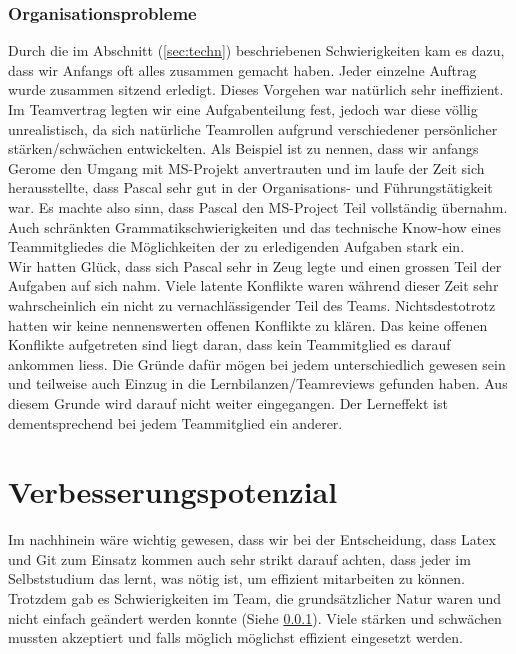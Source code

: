 \subsubsection {Organisationsprobleme} \label{sec:orgprob}
Durch die im Abschnitt (\ref{sec:techn}) beschriebenen Schwierigkeiten kam es dazu, dass wir Anfangs oft alles zusammen gemacht haben. Jeder einzelne Auftrag wurde zusammen sitzend erledigt. Dieses Vorgehen war natürlich sehr ineffizient. Im Teamvertrag legten wir eine Aufgabenteilung fest, jedoch war diese völlig unrealistisch, da sich natürliche Teamrollen aufgrund verschiedener persönlicher stärken/schwächen entwickelten. Als Beispiel ist zu nennen, dass wir anfangs Gerome den Umgang mit MS-Projekt anvertrauten und im laufe der Zeit sich herausstellte, dass Pascal sehr gut in der Organisations- und Führungstätigkeit war. Es machte also sinn, dass Pascal den MS-Project Teil vollständig übernahm. Auch schränkten Grammatikschwierigkeiten und das technische Know-how eines Teammitgliedes die Möglichkeiten der zu erledigenden Aufgaben stark ein. \\
Wir hatten Glück, dass sich Pascal sehr in Zeug legte und einen grossen Teil der Aufgaben auf sich nahm. Viele latente Konflikte waren während dieser Zeit sehr wahrscheinlich ein nicht zu vernachlässigender Teil des Teams. Nichtsdestotrotz hatten wir keine nennenswerten offenen Konflikte zu klären. Das keine offenen Konflikte aufgetreten sind liegt daran, dass kein Teammitglied es darauf ankommen liess. Die Gründe dafür mögen bei jedem unterschiedlich gewesen sein und teilweise auch Einzug in die Lernbilanzen/Teamreviews gefunden haben. Aus diesem Grunde wird darauf nicht weiter eingegangen. Der Lerneffekt ist dementsprechend bei jedem Teammitglied ein anderer.

\section{Verbesserungspotenzial}

Im nachhinein wäre wichtig gewesen, dass wir bei der Entscheidung, dass Latex und Git zum Einsatz kommen auch sehr strikt darauf achten, dass jeder im Selbststudium das lernt, was nötig ist, um effizient mitarbeiten zu können. \\
Trotzdem gab es Schwierigkeiten im Team, die grundsätzlicher Natur waren und nicht einfach geändert werden konnte (Siehe \ref{sec:orgprob}). Viele stärken und schwächen mussten akzeptiert und falls möglich möglichst effizient eingesetzt werden. 